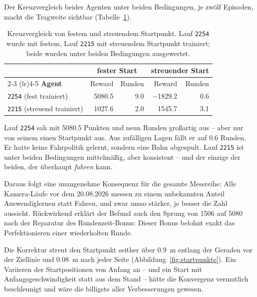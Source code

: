 Der Kreuzvergleich beider Agenten unter beiden Bedingungen, je zwölf Episoden, macht die Tragweite sichtbar (Tabelle~\ref{tab:startpunkte}).

\begin{table}[htbp]
  \centering
  \caption{Kreuzvergleich von festem und streuendem Startpunkt. Lauf \texttt{2254} wurde mit festem, Lauf \texttt{2215} mit streuendem Startpunkt trainiert; beide wurden unter beiden Bedingungen ausgewertet.}
  \label{tab:startpunkte}
  \begin{tabular}{@{}l r r r r@{}}
    \toprule
    & \multicolumn{2}{c}{\textbf{fester Start}} & \multicolumn{2}{c}{\textbf{streuender Start}} \\
    \cmidrule(lr){2-3} \cmidrule(lr){4-5}
    \textbf{Agent} & Reward & Runden & Reward & Runden \\
    \midrule
    \texttt{2254} (fest trainiert)     & \num{5080.5} & \num{9.0} & \num{-1829.2} & \num{0.6} \\
    \texttt{2215} (streuend trainiert) & \num{1027.6} & \num{2.0} & \num{1545.7}  & \num{3.1} \\
    \bottomrule
  \end{tabular}
\end{table}

Lauf \texttt{2254} sah mit \num{5080.5} Punkten und neun Runden großartig aus -- aber nur von seinem einen Startpunkt aus. Aus zufälligen Lagen fällt er auf \num{0.6} Runden. Er hatte keine Fahrpolitik gelernt, sondern eine Bahn abgespult. Lauf \texttt{2215} ist unter beiden Bedingungen mittelmäßig, aber konsistent -- und der einzige der beiden, der überhaupt \emph{fahren} kann.

Daraus folgt eine unangenehme Konsequenz für die gesamte Messreihe: Alle Kamera-Läufe vor dem 20.08.2026 messen zu einem unbekannten Anteil Auswendiglernen statt Fahren, und zwar umso stärker, je besser die Zahl aussieht. Rückwirkend erklärt der Befund auch den Sprung von \num{1506} auf \num{5080} nach der Reparatur des Rundenzeit-Bonus: Dieser Bonus belohnt exakt das Perfektionieren einer wiederholten Runde.

Die Korrektur streut den Startpunkt seither über \SI{0.9}{\meter} entlang der Geraden vor der Ziellinie und \SI{0.08}{\meter} nach jeder Seite (Abbildung~\ref{fig:startpunkte}). Ein Variieren der Startpositionen von Anfang an -- und ein Start mit Anfangsgeschwindigkeit statt aus dem Stand -- hätte die Konvergenz vermutlich beschleunigt und wäre die billigste aller Verbesserungen gewesen.

